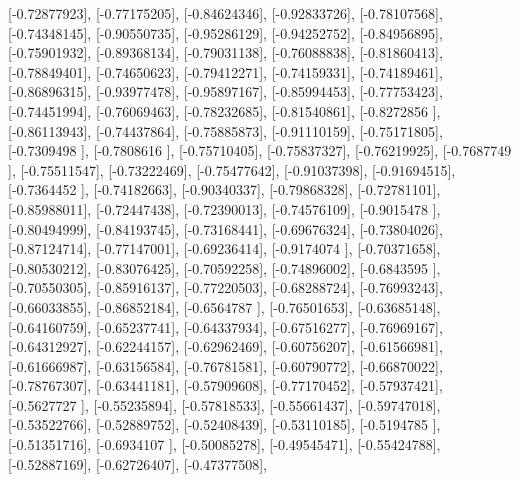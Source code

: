 \documentclass{article}
\begin{document}
       [-0.72877923],
       [-0.77175205],
       [-0.84624346],
       [-0.92833726],
       [-0.78107568],
       [-0.74348145],
       [-0.90550735],
       [-0.95286129],
       [-0.94252752],
       [-0.84956895],
       [-0.75901932],
       [-0.89368134],
       [-0.79031138],
       [-0.76088838],
       [-0.81860413],
       [-0.78849401],
       [-0.74650623],
       [-0.79412271],
       [-0.74159331],
       [-0.74189461],
       [-0.86896315],
       [-0.93977478],
       [-0.95897167],
       [-0.85994453],
       [-0.77753423],
       [-0.74451994],
       [-0.76069463],
       [-0.78232685],
       [-0.81540861],
       [-0.8272856 ],
       [-0.86113943],
       [-0.74437864],
       [-0.75885873],
       [-0.91110159],
       [-0.75171805],
       [-0.7309498 ],
       [-0.7808616 ],
       [-0.75710405],
       [-0.75837327],
       [-0.76219925],
       [-0.7687749 ],
       [-0.75511547],
       [-0.73222469],
       [-0.75477642],
       [-0.91037398],
       [-0.91694515],
       [-0.7364452 ],
       [-0.74182663],
       [-0.90340337],
       [-0.79868328],
       [-0.72781101],
       [-0.85988011],
       [-0.72447438],
       [-0.72390013],
       [-0.74576109],
       [-0.9015478 ],
       [-0.80494999],
       [-0.84193745],
       [-0.73168441],
       [-0.69676324],
       [-0.73804026],
       [-0.87124714],
       [-0.77147001],
       [-0.69236414],
       [-0.9174074 ],
       [-0.70371658],
       [-0.80530212],
       [-0.83076425],
       [-0.70592258],
       [-0.74896002],
       [-0.6843595 ],
       [-0.70550305],
       [-0.85916137],
       [-0.77220503],
       [-0.68288724],
       [-0.76993243],
       [-0.66033855],
       [-0.86852184],
       [-0.6564787 ],
       [-0.76501653],
       [-0.63685148],
       [-0.64160759],
       [-0.65237741],
       [-0.64337934],
       [-0.67516277],
       [-0.76969167],
       [-0.64312927],
       [-0.62244157],
       [-0.62962469],
       [-0.60756207],
       [-0.61566981],
       [-0.61666987],
       [-0.63156584],
       [-0.76781581],
       [-0.60790772],
       [-0.66870022],
       [-0.78767307],
       [-0.63441181],
       [-0.57909608],
       [-0.77170452],
       [-0.57937421],
       [-0.5627727 ],
       [-0.55235894],
       [-0.57818533],
       [-0.55661437],
       [-0.59747018],
       [-0.53522766],
       [-0.52889752],
       [-0.52408439],
       [-0.53110185],
       [-0.5194785 ],
       [-0.51351716],
       [-0.6934107 ],
       [-0.50085278],
       [-0.49545471],
       [-0.55424788],
       [-0.52887169],
       [-0.62726407],
       [-0.47377508],
\end{document}
